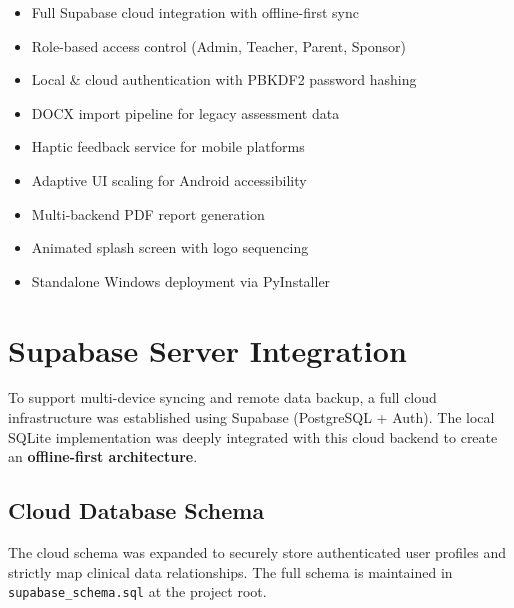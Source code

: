 \documentclass[12pt,a4paper]{article}
\begin{document}
\begin{itemize}[leftmargin=2em]
    \item Full Supabase cloud integration with offline-first sync
    \item Role-based access control (Admin, Teacher, Parent, Sponsor)
    \item Local \& cloud authentication with PBKDF2 password hashing
    \item DOCX import pipeline for legacy assessment data
    \item Haptic feedback service for mobile platforms
    \item Adaptive UI scaling for Android accessibility
    \item Multi-backend PDF report generation
    \item Animated splash screen with logo sequencing
    \item Standalone Windows deployment via PyInstaller
\end{itemize}

\section{Supabase Server Integration}

To support multi-device syncing and remote data backup, a full cloud infrastructure was established using Supabase (PostgreSQL + Auth). The local SQLite implementation was deeply integrated with this cloud backend to create an \textbf{offline-first architecture}.

\subsection{Cloud Database Schema}

The cloud schema was expanded to securely store authenticated user profiles and strictly map clinical data relationships. The full schema is maintained in \texttt{supabase\_schema.sql} at the project root.
\end{document}
